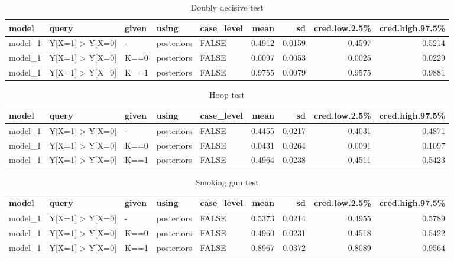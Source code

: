 \documentclass[
  12pt,
]{book}
\begin{document}
\begin{table}

\caption{\label{tab:unnamed-chunk-92}Doubly decisive test}
\centering
\begin{tabular}[t]{l|l|l|l|l|r|r|r|r}
\hline
model & query & given & using & case\_level & mean & sd & cred.low.2.5\% & cred.high.97.5\%\\
\hline
model\_1 & Y[X=1] > Y[X=0] & - & posteriors & FALSE & 0.4912 & 0.0159 & 0.4597 & 0.5214\\
\hline
model\_1 & Y[X=1] > Y[X=0] & K==0 & posteriors & FALSE & 0.0097 & 0.0053 & 0.0025 & 0.0229\\
\hline
model\_1 & Y[X=1] > Y[X=0] & K==1 & posteriors & FALSE & 0.9755 & 0.0079 & 0.9575 & 0.9881\\
\hline
\end{tabular}
\end{table}

\begin{table}

\caption{\label{tab:unnamed-chunk-92}Hoop test}
\centering
\begin{tabular}[t]{l|l|l|l|l|r|r|r|r}
\hline
model & query & given & using & case\_level & mean & sd & cred.low.2.5\% & cred.high.97.5\%\\
\hline
model\_1 & Y[X=1] > Y[X=0] & - & posteriors & FALSE & 0.4455 & 0.0217 & 0.4031 & 0.4871\\
\hline
model\_1 & Y[X=1] > Y[X=0] & K==0 & posteriors & FALSE & 0.0431 & 0.0264 & 0.0091 & 0.1097\\
\hline
model\_1 & Y[X=1] > Y[X=0] & K==1 & posteriors & FALSE & 0.4964 & 0.0238 & 0.4511 & 0.5423\\
\hline
\end{tabular}
\end{table}

\begin{table}

\caption{\label{tab:unnamed-chunk-92}Smoking gun test}
\centering
\begin{tabular}[t]{l|l|l|l|l|r|r|r|r}
\hline
model & query & given & using & case\_level & mean & sd & cred.low.2.5\% & cred.high.97.5\%\\
\hline
model\_1 & Y[X=1] > Y[X=0] & - & posteriors & FALSE & 0.5373 & 0.0214 & 0.4955 & 0.5789\\
\hline
model\_1 & Y[X=1] > Y[X=0] & K==0 & posteriors & FALSE & 0.4960 & 0.0231 & 0.4518 & 0.5422\\
\hline
model\_1 & Y[X=1] > Y[X=0] & K==1 & posteriors & FALSE & 0.8967 & 0.0372 & 0.8089 & 0.9564\\
\hline
\end{tabular}
\end{table}
\end{document}
